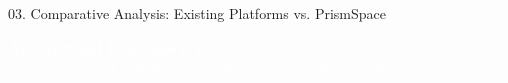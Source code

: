 \documentclass[aspectratio=169,10pt]{beamer}
\begin{document}
\begin{frame}[t]{03. Comparative Analysis: Existing Platforms vs. PrismSpace}
\vspace{-0.44em}

\centering
\begin{tcolorbox}[
  enhanced, colback=lavenderDark!90, colframe=lavenderDark, arc=3pt,
  boxrule=0.5pt, width=0.98\linewidth, top=1.4pt, bottom=1.4pt, left=8pt, right=8pt,
  halign=center
]
  \textcolor{white}{\fontsize{6.6}{8.0}\selectfont\sffamily
  \textbf{Architectural Benchmark:} Evaluating PrismSpace against industry-standard conversational AI, autonomous agents, and swarm frameworks.}
\end{tcolorbox}

\vspace{-0.46em}


\end{frame}
\end{document}
